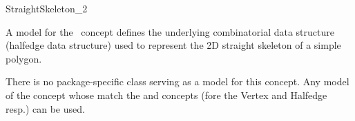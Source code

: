 
\ccRefPageBegin


\begin{ccRefConcept}{StraightSkeleton_2}


   A model for the \ccRefName\ concept defines the underlying
   combinatorial data structure (halfedge data structure) used to
   represent the 2D straight skeleton of a simple polygon.

\ccRefines
{}

\ccTypes


\ccHasModels

There is no package-specific class serving as a model for this concept. Any model of the 
 concept whose  match the  and  concepts (fore the Vertex and Halfedge resp.) can be used.

\end{ccRefConcept} %
\ccRefPageEnd

